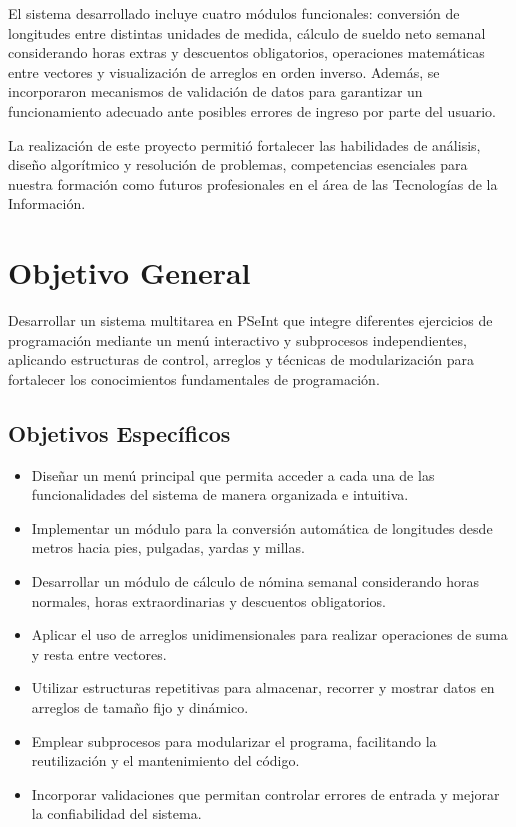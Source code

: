 \documentclass[12pt,a4paper]{article}
\begin{document}
El sistema desarrollado incluye cuatro módulos funcionales: conversión de longitudes entre distintas unidades de medida, cálculo de sueldo neto semanal considerando horas extras y descuentos obligatorios, operaciones matemáticas entre vectores y visualización de arreglos en orden inverso. Además, se incorporaron mecanismos de validación de datos para garantizar un funcionamiento adecuado ante posibles errores de ingreso por parte del usuario.

La realización de este proyecto permitió fortalecer las habilidades de análisis, diseño algorítmico y resolución de problemas, competencias esenciales para nuestra formación como futuros profesionales en el área de las Tecnologías de la Información.

\section{\textcolor{azulUNEMI}{Objetivo General}}


Desarrollar un sistema multitarea en PSeInt que integre diferentes ejercicios de programación mediante un menú interactivo y subprocesos independientes, aplicando estructuras de control, arreglos y técnicas de modularización para fortalecer los conocimientos fundamentales de programación.

\subsection{\textcolor{azulUNEMI}{Objetivos Específicos}}


\begin{itemize}
	\item Diseñar un menú principal que permita acceder a cada una de las funcionalidades del sistema de manera organizada e intuitiva.
	\item Implementar un módulo para la conversión automática de longitudes desde metros hacia pies, pulgadas, yardas y millas.
	\item Desarrollar un módulo de cálculo de nómina semanal considerando horas normales, horas extraordinarias y descuentos obligatorios.
	\item Aplicar el uso de arreglos unidimensionales para realizar operaciones de suma y resta entre vectores.
	\item Utilizar estructuras repetitivas para almacenar, recorrer y mostrar datos en arreglos de tamaño fijo y dinámico.
	\item Emplear subprocesos para modularizar el programa, facilitando la reutilización y el mantenimiento del código.
	\item Incorporar validaciones que permitan controlar errores de entrada y mejorar la confiabilidad del sistema.
\end{itemize}
\end{document}
